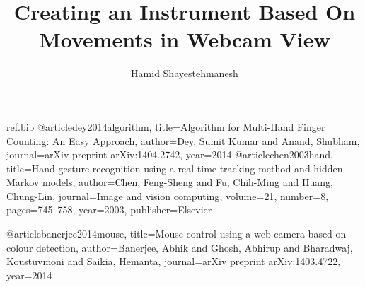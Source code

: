 \RequirePackage{filecontents}
\begin{filecontents}{ref.bib}
@article{dey2014algorithm,
  title={Algorithm for Multi-Hand Finger Counting: An Easy Approach},
  author={Dey, Sumit Kumar and Anand, Shubham},
  journal={arXiv preprint arXiv:1404.2742},
  year={2014}
}
@article{chen2003hand,
  title={Hand gesture recognition using a real-time tracking method and hidden Markov models},
  author={Chen, Feng-Sheng and Fu, Chih-Ming and Huang, Chung-Lin},
  journal={Image and vision computing},
  volume={21},
  number={8},
  pages={745--758},
  year={2003},
  publisher={Elsevier}
}

@article{banerjee2014mouse,
  title={Mouse control using a web camera based on colour detection},
  author={Banerjee, Abhik and Ghosh, Abhirup and Bharadwaj, Koustuvmoni and Saikia, Hemanta},
  journal={arXiv preprint arXiv:1403.4722},
  year={2014}
}

\end{filecontents}
\documentclass{report}
\setcounter{secnumdepth}{3}
\usepackage{graphicx}
\usepackage[round]{natbib}




\author{Hamid Shayestehmanesh}
\title{Creating an Instrument Based On Movements in Webcam View}
\maketitle
\tableofcontents
\newpage

\chapter{Main Project Idea}
The main idea in this project is to build a HCI(Human Computer Interaction) application which can shape the music and users can draw it. In other words, we want to design and build an application which is able to translate hands gestures to meaningful sounds and build a new electronic music instrument.

\section{More Specified}
The goals of this project is to design an architecture of such application and build a prototype to detect hands and their movements. To do so, we use different colored cameras and regular speakers are used to generate sounds. Devices and implementation environment will be discussed in details later.
\pagebreak


